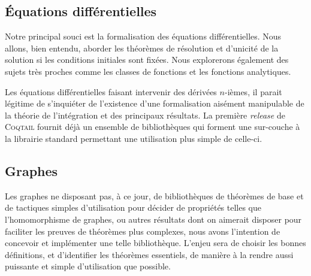 \documentclass[11pt]{article}
\newcommand{\coqtail}{\textsc{Coqtail}}
\begin{document}
\subsection{Équations différentielles}

Notre principal souci est la formalisation des équations différentielles. Nous allons, bien entendu, aborder les théorèmes de résolution et d'unicité de la solution si les conditions initiales sont fixées. Nous explorerons également des sujets très proches comme les classes de fonctions et les fonctions analytiques.

Les équations différentielles faisant intervenir des dérivées $n$-ièmes, il parait légitime de s'inquiéter de l'existence d'une formalisation aisément manipulable de la théorie de l'intégration et des principaux résultats. La première \textit{release} de \coqtail{} fournit déjà un ensemble de bibliothèques qui forment une sur-couche à la librairie standard permettant une utilisation plus simple de celle-ci.

\subsection{Graphes}

Les graphes ne disposant pas, à ce jour, de bibliothèques de théorèmes de base et de tactiques simples d'utilisation pour décider de propriétés telles que l'homomorphisme de graphes, ou autres résultats dont on aimerait disposer pour faciliter les preuves de théorèmes plus complexes, nous avons l'intention de concevoir et implémenter une telle bibliothèque. L'enjeu sera de choisir les bonnes définitions, et d'identifier les théorèmes essentiels, de manière à la rendre aussi puissante et simple d'utilisation que possible.
\end{document}
